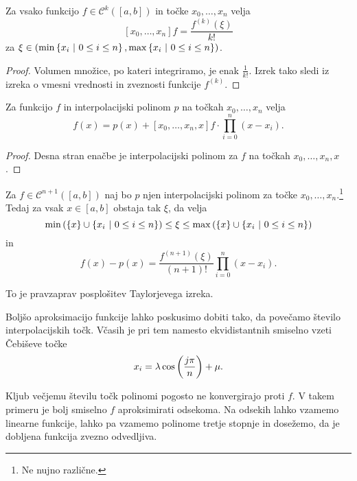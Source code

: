 \begin{posledica}
Za vsako funkcijo $f \in \mathcal{C}^k([a,b])$ in točke
$x_0, \dots, x_n$ velja
\[
[x_0, \dots, x_n] f = \frac{f^{(k)}(\xi)}{k!}
\]
za $\xi \in \left(\min \left\{x_i~\middle\vert~0 \leq i \leq n\right\},
\max \left\{x_i~\middle\vert~0 \leq i \leq n\right\}\right)$.
\end{posledica}

\begin{proof}
Volumen množice, po kateri integriramo, je enak $\frac{1}{k!}$.
Izrek tako sledi iz izreka o vmesni vrednosti in zveznosti funkcije
$f^{(k)}$.
\end{proof}

\begin{izrek}
Za funkcijo $f$ in interpolacijski polinom $p$ na točkah
$x_0, \dots, x_n$ velja
\[
f(x) = p(x) + [x_0, \dots, x_n, x] f \cdot \prod_{i=0}^n (x - x_i).
\]
\end{izrek}

\begin{proof}
Desna stran enačbe je interpolacijski polinom za $f$ na točkah
$x_0, \dots, x_n, x$.
\end{proof}

\begin{posledica}
Za $f \in \mathcal{C}^{n+1}([a,b])$ naj bo $p$ njen interpolacijski
polinom za točke $x_0, \dots, x_n$.\footnote{Ne nujno različne.}
Tedaj za vsak $x \in [a,b]$ obstaja tak $\xi$, da velja
\[
\min \left(\left\{x\right\} \cup \left\{x_i~\middle\vert~0 \leq i \leq n\right\}\right) \leq
\xi \leq
\max \left(\left\{x\right\} \cup \left\{x_i~\middle\vert~0 \leq i \leq n\right\}\right)
\]
in
\[
f(x) - p(x) =
\frac{f^{(n+1)}(\xi)}{(n+1)!} \prod_{i=0}^n (x - x_i).
\]
\end{posledica}

\obvs

\begin{opomba}
To je pravzaprav posplošitev Taylorjevega izreka.
\end{opomba}

\begin{opomba}
Boljšo aproksimacijo funkcije lahko poskusimo dobiti tako, da
povečamo število interpolacijskih točk. Včasih je pri tem namesto
ekvidistantnih smiselno vzeti Čebiševe točke
\[
x_i = \lambda \cos \left(\frac{j \pi}{n}\right) + \mu.
\]
\end{opomba}

\begin{opomba}
Kljub večjemu številu točk polinomi pogosto ne konvergirajo proti
$f$. V takem primeru je bolj smiselno $f$ aproksimirati odsekoma.
Na odsekih lahko vzamemo linearne funkcije, lahko pa vzamemo
polinome tretje stopnje in dosežemo, da je dobljena funkcija zvezno
odvedljiva.
\end{opomba}
